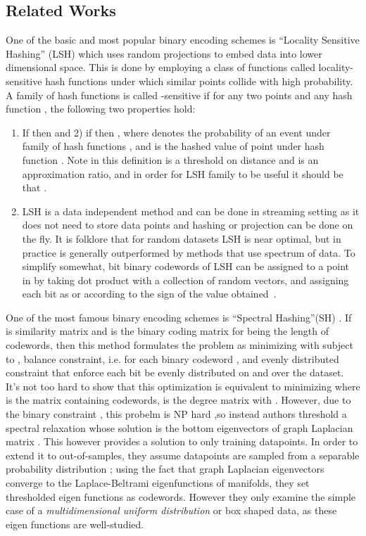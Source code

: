 \documentclass{sig-alternate}
\begin{document}
\subsection{Related Works}
One of the basic and most popular binary encoding schemes is ``Locality Sensitive Hashing'' (LSH)\cite{datar2004locality} which uses random projections to embed data into lower dimensional space. This is done by employing a class of functions called locality-sensitive hash functions under which similar points collide with high probability.
A family of hash functions  is called -sensitive if for any two points  and any hash function , the following two properties hold:
\begin{enumerate}
\item{If  then  and 2) if  then , where  denotes the probability of an event under family of hash functions , and  is the hashed value of point  under hash function . Note in this definition  is a threshold on distance and  is an approximation ratio, and in order for LSH family to be useful it should be that .}
\item{LSH is a data independent method and can be done in streaming setting as it does not need to store data points and hashing or projection can be done on the fly. It is folklore that for random datasets LSH is near optimal, but in practice is generally outperformed by methods that use spectrum of data. To simplify somewhat,  bit binary codewords of LSH can be assigned to a point in  by taking dot product with a collection of  random vectors, and assigning each bit as  or  according to the sign of the value obtained~\cite{binarylsh}.}
\end{enumerate} 

One of the most famous binary encoding schemes is ``Spectral Hashing''(SH) \cite{weiss2009spectral}. If  is similarity matrix and  is the binary coding matrix for  being the length of codewords, then this method 
formulates the problem as minimizing  with subject to , balance constraint, i.e.  for each binary codeword , and evenly distributed constraint that enforce each bit be evenly distributed on  and  over the dataset.
It's not too hard to show that this optimization is equivalent to minimizing  where  is the matrix containing codewords,  is the degree matrix with . 
However, due to the binary constraint , this probelm is NP hard ,so instead authors threshold a spectral
relaxation whose solution is the bottom  eigenvectors of graph Laplacian matrix . 
This however provides a solution to only training datapoints. In order to extend it to out-of-samples, they assume datapoints are sampled from a separable probability distribution ; using the fact that graph Laplacian eigenvectors converge to the Laplace-Beltrami eigenfunctions of manifolds, they set thresholded eigen functions as codewords. However they only examine the simple case of a \textit{multidimensional uniform distribution} or box shaped data, as these eigen functions are well-studied. 
\end{document}
